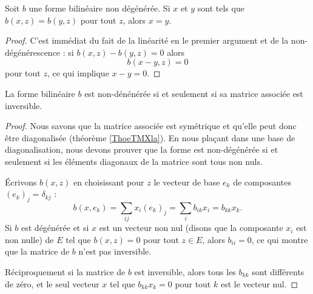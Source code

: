 \begin{lemma}   \label{LemyKJpVP}
    Soit \( b\) une forme bilinéaire non dégénérée. Si \( x\) et \( y\) sont tels que \( b(x,z)=b(y,z)\) pour tout \( z\), alors \( x=y\).
\end{lemma}

\begin{proof}
    C'est immédiat du fait de la linéarité en le premier argument et de la non-dégénérescence : si \( b(x,z)-b(y,z)=0\) alors
    \begin{equation}
        b(x-y,z)=0
    \end{equation}
    pour tout \( z\), ce qui implique \( x-y=0\).
\end{proof}

\begin{proposition}
    La forme bilinéaire \( b\) est non-dénénérée si et seulement si sa matrice associée est inversible.
\end{proposition}

\begin{proof}
    Nous savons que la matrice associée est symétrique et qu'elle peut donc être diagonalisée (théorème \ref{ThoeTMXla}). En nous plaçant dans une base de diagonalisation, nous devons prouver que la forme est non-dégénérée si et seulement si les éléments diagonaux de la matrice sont tous non nuls.

    Écrivons \( b(x,z)\) en choisissant pour \( z\) le vecteur de base \( e_k\) de composantes \( (e_k)_j=\delta_{kj}\) :
    \begin{equation}
            b(x,e_k)=\sum_{ij}x_i(e_k)_j
            =\sum_i b_{ik}x_i
            =b_{kk}x_k.
    \end{equation}
    Si \( b\) est dégénérée et si \( x\) est un vecteur non nul (disons que la composante \( x_i\) est non nulle) de \( E\) tel que \( b(x,z)=0\) pour tout \( z\in E\), alors \( b_{ii}=0\), ce qui montre que la matrice de \( b\) n'est pas inversible.

    Réciproquement si la matrice de \( b\) est inversible, alors tous les \( b_{kk}\) sont différents de zéro, et le seul vecteur \( x\) tel que \( b_{kk}x_k=0\) pour tout \( k\) est le vecteur nul.
\end{proof}


